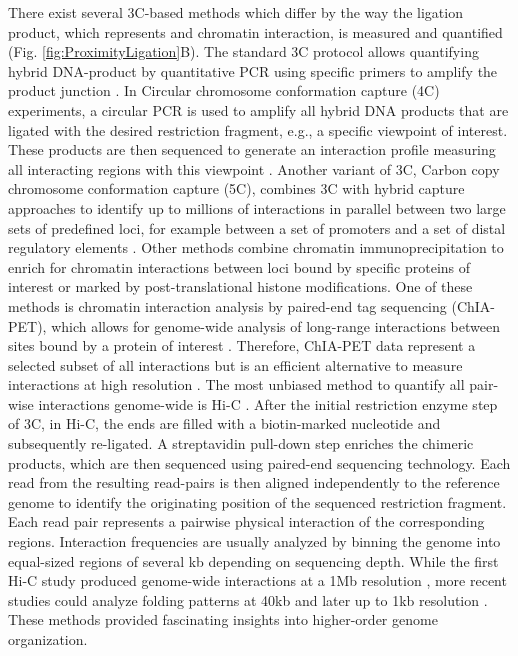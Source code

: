 \documentclass[a4paper,twoside=true,openright,parskip=full,chapterprefix=true,11pt,headings=normal,bibliography=totoc,listof=totoc,titlepage=on,captions=tableabove,draft=false]{scrreprt}
\theoremstyle{definition}
\theoremstyle{definition}
\theoremstyle{definition}
\theoremstyle{remark}
\begin{document}
There exist several 3C-based methods which differ by the way the
ligation product, which represents and chromatin interaction, is
measured and quantified (Fig. \ref{fig:ProximityLigation}B). The
standard 3C protocol allows quantifying hybrid DNA-product by
quantitative PCR using specific primers to amplify the product junction
\citep{Dekker2002}. In Circular chromosome conformation capture (4C)
experiments, a circular PCR is used to amplify all hybrid DNA products
that are ligated with the desired restriction fragment, e.g., a specific
viewpoint of interest. These products are then sequenced to generate an
interaction profile measuring all interacting regions with this
viewpoint \citep{Simonis2006, Noordermeer2011}. Another variant of 3C,
Carbon copy chromosome conformation capture (5C), combines 3C with
hybrid capture approaches to identify up to millions of interactions in
parallel between two large sets of predefined loci, for example between
a set of promoters and a set of distal regulatory elements
\citep{Dostie2006, Sanyal2012}. Other methods combine chromatin
immunoprecipitation to enrich for chromatin interactions between loci
bound by specific proteins of interest or marked by post-translational
histone modifications. One of these methods is chromatin interaction
analysis by paired-end tag sequencing (ChIA-PET), which allows for
genome-wide analysis of long-range interactions between sites bound by a
protein of interest \citep{Fullwood2009}. Therefore, ChIA-PET data
represent a selected subset of all interactions but is an efficient
alternative to measure interactions at high resolution \citep{Tang2015}.
The most unbiased method to quantify all pair-wise interactions
genome-wide is Hi-C \citep{Lieberman-Aiden2009}. After the initial
restriction enzyme step of 3C, in Hi-C, the ends are filled with a
biotin-marked nucleotide and subsequently re-ligated. A streptavidin
pull-down step enriches the chimeric products, which are then sequenced
using paired-end sequencing technology. Each read from the resulting
read-pairs is then aligned independently to the reference genome to
identify the originating position of the sequenced restriction fragment.
Each read pair represents a pairwise physical interaction of the
corresponding regions. Interaction frequencies are usually analyzed by
binning the genome into equal-sized regions of several kb depending on
sequencing depth. While the first Hi-C study produced genome-wide
interactions at a 1Mb resolution \citep{Lieberman-Aiden2009}, more
recent studies could analyze folding patterns at 40kb \citep{Dixon2012}
and later up to 1kb resolution \citep{Rao2014}. These methods provided
fascinating insights into higher-order genome organization.
\end{document}
